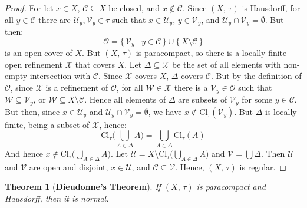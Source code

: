 \documentclass{article}
\theoremstyle{plain}
\newtheorem{theorem}{Theorem}[section]
\theoremstyle{normal}
\begin{document}
        \begin{proof}
            For let $x\in{X}$, $\mathcal{C}\subseteq{X}$ be closed, and
            $x\notin\mathcal{C}$. Since $(X,\,\tau)$ is Hausdorff, for all
            $y\in\mathcal{C}$ there are $\mathcal{U}_{y},\mathcal{V}_{y}\in\tau$
            such that $x\in\mathcal{U}_{y}$, $y\in\mathcal{V}_{y}$, and
            $\mathcal{U}_{y}\cap\mathcal{V}_{y}=\emptyset$. But then:
            \begin{equation}
                \mathcal{O}=\{\,\mathcal{V}_{y}\;|\;y\in\mathcal{C}\,\}
                \cup\{\,X\setminus\mathcal{C}\,\}
            \end{equation}
            is an open cover of $X$. But $(X,\,\tau)$ is paracompact, so there
            is a locally finite open refinement $\mathcal{X}$ that covers $X$.
            Let $\Delta\subseteq\mathcal{X}$ be the set of all elements with
            non-empty intersection with $\mathcal{C}$. Since $\mathcal{X}$
            covers $X$, $\Delta$ covers $\mathcal{C}$. But by the definition
            of $\mathcal{O}$, since $\mathcal{X}$ is a refinement of
            $\mathcal{O}$, for all $\mathcal{W}\in\mathcal{X}$ there is a
            $\mathcal{V}_{y}\in\mathcal{O}$ such that
            $\mathcal{W}\subseteq\mathcal{V}_{y}$, or
            $\mathcal{W}\subseteq{X}\setminus\mathcal{C}$. Hence all elements
            of $\Delta$ are subsets of $\mathcal{V}_{y}$ for some
            $y\in\mathcal{C}$. But then, since $x\in\mathcal{U}_{y}$ and
            $\mathcal{U}_{y}\cap\mathcal{V}_{y}=\emptyset$, we have
            $x\notin\textrm{Cl}_{\tau}(\mathcal{V}_{y})$. But
            $\Delta$ is locally finite, being a subset of $\mathcal{X}$, hence:
            \begin{equation}
                \textrm{Cl}_{\tau}\Big(\bigcup_{A\in\Delta}A\Big)
                =\bigcup_{A\in\Delta}\textrm{Cl}_{\tau}(A)
            \end{equation} 
            And hence $x\notin\textrm{Cl}_{\tau}\big(\bigcup_{A\in\Delta}A\big)$.
            Let $\mathcal{U}=X\setminus\textrm{Cl}_{\tau}\Big(\bigcup_{A\in\Delta}A\Big)$
            and $\mathcal{V}=\bigcup\Delta$. Then $\mathcal{U}$ and $\mathcal{V}$
            are open and disjoint, $x\in\mathcal{U}$, and
            $\mathcal{C}\subseteq\mathcal{V}$. Hence, $(X,\,\tau)$ is regular.
        \end{proof}
        \begin{theorem}[\textbf{Dieudonne's Theorem}]
            If $(X,\,\tau)$ is paracompact and Hausdorff, then it is normal.
        \end{theorem}
\end{document}
